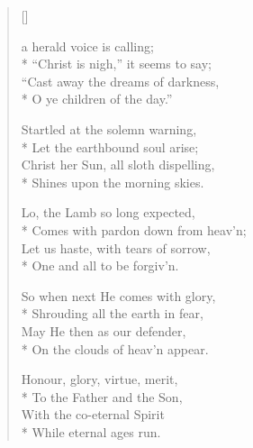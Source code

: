  \newHymn

\begin{verse}[\versewidth]

 a herald voice is calling;\\*
``Christ is nigh,'' it seems to say;\\
``Cast away the dreams of darkness,   \\* 
 O ye children of the day.''


Startled at the solemn warning,       \\*
 Let the earthbound soul arise;        \\
 Christ her Sun, all sloth dispelling, \\*
 Shines upon the morning skies.        


Lo, the Lamb so long expected,        \\*
 Comes with pardon down from heav'n;   \\
 Let us haste, with tears of sorrow,   \\*
 One and all to be forgiv'n.           


So when next He comes with glory,     \\*
 Shrouding all the earth in fear,     \\
 May He then as our defender,          \\*
 On the clouds of heav'n appear.       

Honour, glory, virtue, merit,\\*
To the Father and the Son,\\
With the co-eternal Spirit\\*
While eternal ages run.

\end{verse}

